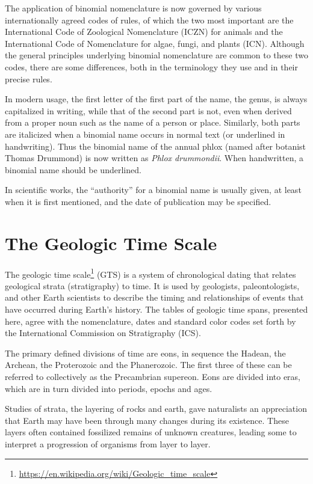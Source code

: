 \documentclass[]{book}
\let\rmarkdownfootnote\footnote%
\def\footnote{\protect\rmarkdownfootnote}
\renewcommand{\href}[2]{#2\footnote{\url{#1}}}
\begin{document}
The application of binomial nomenclature is now governed by various internationally agreed codes of rules, of which the two most important are the International Code of Zoological Nomenclature (ICZN) for animals and the International Code of Nomenclature for algae, fungi, and plants (ICN). Although the general principles underlying binomial nomenclature are common to these two codes, there are some differences, both in the terminology they use and in their precise rules.

In modern usage, the first letter of the first part of the name, the genus, is always capitalized in writing, while that of the second part is not, even when derived from a proper noun such as the name of a person or place. Similarly, both parts are italicized when a binomial name occurs in normal text (or underlined in handwriting). Thus the binomial name of the annual phlox (named after botanist Thomas Drummond) is now written as \emph{Phlox drummondii}. When handwritten, a binomial name should be underlined.

In scientific works, the ``authority'' for a binomial name is usually given, at least when it is first mentioned, and the date of publication may be specified.

\hypertarget{the-geologic-time-scale}{%
\section{The Geologic Time Scale}\label{the-geologic-time-scale}}

The \href{https://en.wikipedia.org/wiki/Geologic_time_scale}{geologic time scale} (GTS) is a system of chronological dating that relates geological strata (stratigraphy) to time. It is used by geologists, paleontologists, and other Earth scientists to describe the timing and relationships of events that have occurred during Earth's history. The tables of geologic time spans, presented here, agree with the nomenclature, dates and standard color codes set forth by the International Commission on Stratigraphy (ICS).

The primary defined divisions of time are eons, in sequence the Hadean, the Archean, the Proterozoic and the Phanerozoic. The first three of these can be referred to collectively as the Precambrian supereon. Eons are divided into eras, which are in turn divided into periods, epochs and ages.

Studies of strata, the layering of rocks and earth, gave naturalists an appreciation that Earth may have been through many changes during its existence. These layers often contained fossilized remains of unknown creatures, leading some to interpret a progression of organisms from layer to layer.
\end{document}
